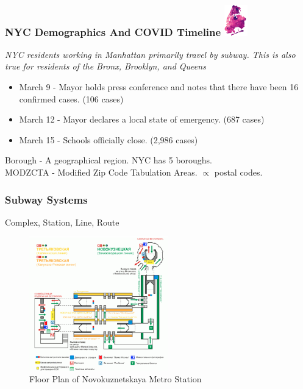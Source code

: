 \documentclass{beamer}
\begin{document}
\begin{frame}
\frametitle{NYC Demographics And COVID Timeline
\includegraphics[width=1cm]{Scratch_Visuals/NYC_COVID_Case_Rate.png}
}
\textit{NYC residents working in Manhattan primarily travel by subway. This is
also true for residents of the Bronx, Brooklyn, and Queens\cite{nyc_commuting}}
\begin{itemize}
	\item March 9 - Mayor holds press conference and notes that there have been 16 confirmed cases. (106 cases)
	\item March 12 - Mayor declares a local state of emergency. (687 cases)
	\item March 15 - Schools officially close. (2,986 cases)
\end{itemize}
Borough - A geographical region. NYC has 5 boroughs. \\
MODZCTA - Modified Zip Code Tabulation Areas. $\propto$ postal codes.\\
\end{frame}
\begin{frame}
\frametitle{Subway Systems}
Complex, Station, Line, Route
\begin{figure}
    \includegraphics[width=6cm]{Scratch_Visuals/Novokuznetskaya.png}
    \caption{Floor Plan of Novokuznetskaya Metro Station \cite{Novokuznetskaya}}
\end{figure}
\end{frame}
\end{document}
